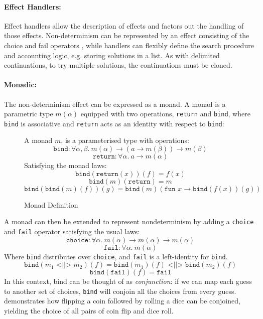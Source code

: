 \paragraph{Effect Handlers:} Effect handlers allow the description of effects and factors out the handling of those effects. Non-determinism can be represented by an effect consisting of the choice and fail operators \cite{EffectsExamples, HandlersInAction}, while handlers can flexibly define the search procedure and accounting logic, e.g. storing solutions in a list. As with delimited continuations, to try multiple solutions, the {continuations} must be cloned.

\paragraph{Monadic:} The non-determinism effect can be expressed as a monad. A monad is a parametric type $m(\alpha)$ equipped with two operations, \texttt{return} and \texttt{bind}, where \texttt{bind} is associative and \texttt{return} acts as an identity with respect to \texttt{bind}:
\begin{figure}[H]
A monad $m$, is a parameterised type with operations:
\[\texttt{bind} : \forall \alpha, \beta.\ m(\alpha) \to (a \to m(\beta)) \to m(\beta)\]
\[\texttt{return} : \forall \alpha.\ a \to m(\alpha)\]
Satisfying the monad laws:
\[\texttt{bind}(\texttt{return}(x))(f) = f(x)\]
\[\texttt{bind}(m)(\texttt{return}) = m\]
\[\texttt{bind}(\texttt{bind}(m)(f))(g) = \texttt{bind}(m)(\texttt{fun } x \to \texttt{bind}(f(x))(g))\]
\caption{Monad Definition}
\end{figure}

A monad can then be extended to represent nondeterminism by adding a \texttt{choice} and \texttt{fail} operator satisfying the usual laws:
\[\texttt{choice} : \forall \alpha.\ m(\alpha) \to m(\alpha) \to m(\alpha)\]
\[\texttt{fail} : \forall \alpha.\ m(\alpha)\]
Where \texttt{bind} distributes over \texttt{choice}, and \texttt{fail} is a left-identity for \texttt{bind}.
\[\texttt{bind}(m_1 \texttt{ <||> } m_2)(f) = \texttt{bind}(m_1)(f) \texttt{ <||> } \texttt{bind}(m_2)(f)\]
\[\texttt{bind}(\texttt{fail})(f) = \texttt{fail}\]
In this context, bind can be thought of as \textit{conjunction}: if we can map each guess to another set of choices, \texttt{bind} will conjoin all the choices from every guess.  demonstrates how flipping a coin followed by rolling a dice can be conjoined, yielding the choice of all pairs of coin flip and dice roll.

